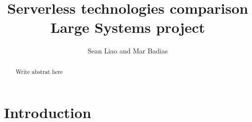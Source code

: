 \documentclass[11pt]{article}
\title{
  Serverless technologies comparison\\
  \large Large Systems project}
\author{Sean Liao and Mar Badias}
\begin{document}
\maketitle




\begin{abstract}
Write abstrat here
\end{abstract}

\newpage

\section{Introduction}
\label{introduction}
\end{document}
